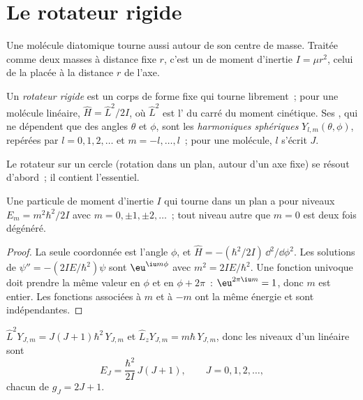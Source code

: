 \section{Le rotateur rigide}

Une molécule diatomique tourne aussi autour de son centre de masse.
Traitée comme deux masses à distance fixe $r$, c'est un 
de moment d'inertie
$I = \mu r^2$, celui de la  placée à la distance $r$ de
l'axe.

\begin{definition}\label{def:b3:quantum-model-systems:rotor}
Un \emph{rotateur rigide} est un corps de forme fixe
qui tourne librement~; pour une molécule linéaire, $\hat H = \hat L^2/2I$,
où $\hat L^2$ est l' du carré du moment cinétique. Ses , qui ne dépendent que des angles $\theta$ et $\phi$, sont les
\emph{harmoniques sphériques} $Y_{l,m}(\theta,\phi)$, repérées par $l =
0, 1, 2, \dots$ et $m = -l, \dots, l$~; pour une molécule, $l$ s'écrit $J$.
\end{definition}

Le rotateur sur un cercle (rotation dans un plan, autour d'un axe fixe)
se résout d'abord~; il contient l'essentiel.

\begin{theorem}[Le cercle]\label{thm:b3:quantum-model-systems:ring}
Une particule de moment d'inertie $I$ qui tourne dans un plan a pour
niveaux $E_m = m^2\hbar^2/2I$ avec $m = 0, \pm1, \pm2, \dots$~; tout niveau
autre que $m = 0$ est deux fois dégénéré.
\end{theorem}

\begin{proof}
La seule coordonnée est l'angle $\phi$, et $\hat H = -(\hbar^2/2I)\,
\dd^2/\dd\phi^2$. Les solutions de $\psi'' = -(2IE/\hbar^2)\psi$ sont $\eu^{\iu
m\phi}$ avec $m^2 = 2IE/\hbar^2$. Une fonction univoque doit prendre la
même valeur en $\phi$ et en $\phi + 2\pi$~: $\eu^{2\pi\iu m} = 1$, donc $m$
est entier. Les fonctions associées à $m$ et à $-m$ ont la même énergie et
sont indépendantes.
\end{proof}

\begin{theorem}\label{thm:b3:quantum-model-systems:rotor}
$\hat L^2Y_{J,m} = J(J+1)\hbar^2\,Y_{J,m}$ et $\hat L_zY_{J,m} = m\hbar\,
Y_{J,m}$, donc les niveaux d'un  linéaire sont
\[
E_J = \frac{\hbar^2}{2I}\,J(J+1), \qquad J = 0, 1, 2, \dots,
\]
chacun de  $g_J = 2J + 1$.
\end{theorem}
\admitted

